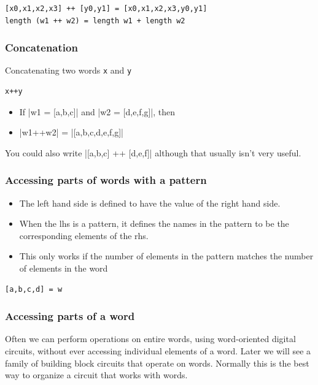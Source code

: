 \documentclass[]{svmono}
\begin{document}
\begin{verbatim}
[x0,x1,x2,x3] ++ [y0,y1] = [x0,x1,x2,x3,y0,y1]
length (w1 ++ w2) = length w1 + length w2
\end{verbatim}
\subsubsection*{Concatenation}
\label{sec:org0cef86d}

Concatenating two words \texttt{x} and \texttt{y}

\begin{verbatim}
x++y
\end{verbatim}

\begin{itemize}
\item If |w1 = [a,b,c]| and |w2 = [d,e,f,g]|, then
\item |w1++w2| = |[a,b,c,d,e,f,g]|
\end{itemize}

You could also write |[a,b,c] ++ [d,e,f]| although that usually isn't
very useful.
\subsubsection*{Accessing parts of words with a pattern}
\label{sec:orgeb4ac30}

\begin{itemize}
\item The left hand side is defined to have the value of the right
hand side.
\item When the lhs is a pattern, it defines the names in the pattern
to be the corresponding elements of the rhs.
\item This only works if the number of elements in the pattern matches
the number of elements in the word
\end{itemize}

\begin{verbatim}
[a,b,c,d] = w
\end{verbatim}
\subsubsection*{Accessing parts of a word}
\label{sec:org4acf765}

Often we can perform operations on entire words, using word-oriented
digital circuits, without ever accessing individual elements of a
word.  Later we will see a family of building block circuits that
operate on words.  Normally this is the best way to organize a circuit
that works with words.
\end{document}
